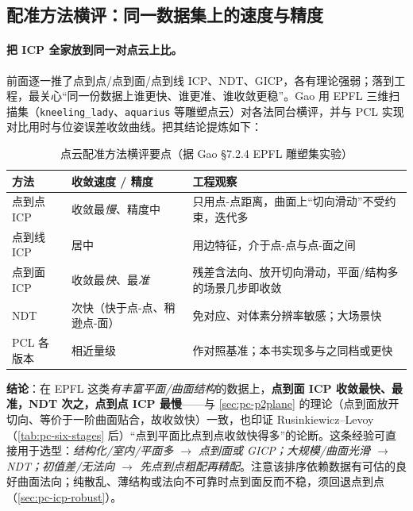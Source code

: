 \subsection{配准方法横评：同一数据集上的速度与精度}
\label{sec:pc-reg-bench}

\paragraph{把 ICP 全家放到同一对点云上比。}
前面逐一推了点到点/点到面/点到线 ICP、NDT、GICP，各有理论强弱；落到工程，最关心“同一份数据上谁更快、谁更准、谁收敛更稳”。Gao\cite{gao2023slamad} 用 EPFL 三维扫描集（\texttt{kneeling\_lady}、\texttt{aquarius} 等雕塑点云）对各法同台横评，并与 PCL 实现对比用时与位姿误差收敛曲线。把其结论提炼如下：

\begin{table}[H]\centering\small
\caption{点云配准方法横评要点（据 Gao §7.2.4 EPFL 雕塑集实验）}
\label{tab:pc-reg-bench}
\begin{tabular}{p{} p{} p{}}
\toprule
方法 & 收敛速度 / 精度 & 工程观察 \\
\midrule
点到点 ICP & 收敛最\emph{慢}、精度中 & 只用点-点距离，曲面上“切向滑动”不受约束，迭代多 \\
点到线 ICP & 居中 & 用边特征，介于点-点与点-面之间 \\
点到面 ICP & 收敛最\emph{快}、最\emph{准} & 残差含法向、放开切向滑动，平面/结构多的场景几步即收敛 \\
NDT & 次快（快于点-点、稍逊点-面） & 免对应、对体素分辨率敏感；大场景快 \\
PCL 各版本 & 相近量级 & 作对照基准；本书实现多与之同档或更快 \\
\bottomrule
\end{tabular}
\end{table}

\noindent\textbf{结论}：在 EPFL 这类\emph{有丰富平面/曲面结构}的数据上，\textbf{点到面 ICP 收敛最快、最准，NDT 次之，点到点 ICP 最慢}——与 \cref{sec:pc-p2plane} 的理论（点到面放开切向、等价于一阶曲面贴合，故收敛快）一致，也印证 Rusinkiewicz--Levoy（\cref{tab:pc-six-stages} 后）“点到平面比点到点收敛快得多”的论断。这条经验可直接用于选型：\emph{结构化/室内/平面多 $\to$ 点到面或 GICP；大规模/曲面光滑 $\to$ NDT；初值差/无法向 $\to$ 先点到点粗配再精配}。注意该排序依赖数据有可估的良好曲面法向；纯散乱、薄结构或法向不可靠时点到面反而不稳，须回退点到点（\cref{sec:pc-icp-robust}）。

